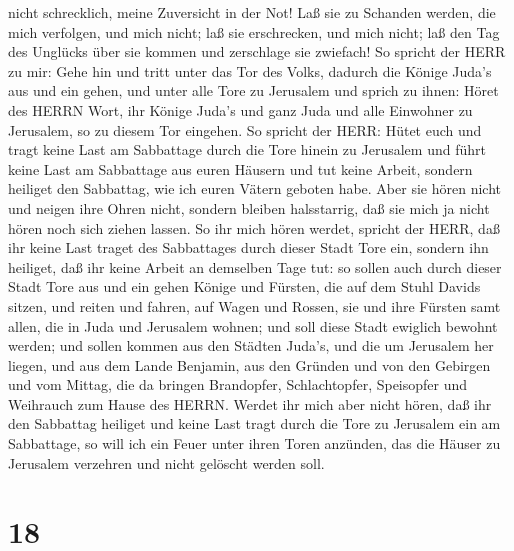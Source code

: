 nicht schrecklich, meine Zuversicht in der Not!  Laß sie zu
Schanden werden, die mich verfolgen, und mich nicht; laß sie
erschrecken, und mich nicht; laß den Tag des Unglücks über sie kommen
und zerschlage sie zwiefach!  So spricht der HERR zu mir:
Gehe hin und tritt unter das Tor des Volks, dadurch die Könige Juda's
aus und ein gehen, und unter alle Tore zu Jerusalem  und
sprich zu ihnen: Höret des HERRN Wort, ihr Könige Juda's und ganz Juda
und alle Einwohner zu Jerusalem, so zu diesem Tor eingehen.
 So spricht der HERR: Hütet euch und tragt keine Last am
Sabbattage durch die Tore hinein zu Jerusalem  und führt
keine Last am Sabbattage aus euren Häusern und tut keine Arbeit, sondern
heiliget den Sabbattag, wie ich euren Vätern geboten habe. 
Aber sie hören nicht und neigen ihre Ohren nicht, sondern bleiben
halsstarrig, daß sie mich ja nicht hören noch sich ziehen lassen.
 So ihr mich hören werdet, spricht der HERR, daß ihr keine
Last traget des Sabbattages durch dieser Stadt Tore ein, sondern ihn
heiliget, daß ihr keine Arbeit an demselben Tage tut:  so
sollen auch durch dieser Stadt Tore aus und ein gehen Könige und
Fürsten, die auf dem Stuhl Davids sitzen, und reiten und fahren, auf
Wagen und Rossen, sie und ihre Fürsten samt allen, die in Juda und
Jerusalem wohnen; und soll diese Stadt ewiglich bewohnt werden;
 und sollen kommen aus den Städten Juda's, und die um
Jerusalem her liegen, und aus dem Lande Benjamin, aus den Gründen und
von den Gebirgen und vom Mittag, die da bringen Brandopfer,
Schlachtopfer, Speisopfer und Weihrauch zum Hause des HERRN.
 Werdet ihr mich aber nicht hören, daß ihr den Sabbattag
heiliget und keine Last tragt durch die Tore zu Jerusalem ein am
Sabbattage, so will ich ein Feuer unter ihren Toren anzünden, das die
Häuser zu Jerusalem verzehren und nicht gelöscht werden soll.

\hypertarget{section-17}{%
\section{18}\label{section-17}}

